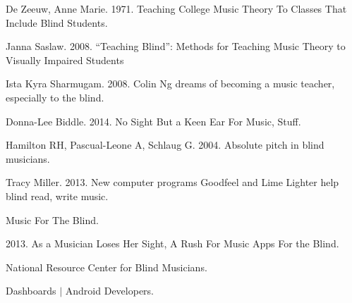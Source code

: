 \documentclass{article}
\begin{document}
\begin{thebibliography}{10}
	De Zeeuw, Anne Marie. 1971. Teaching College Music Theory To Classes That Include Blind Students. 
	
	Janna Saslaw. 2008. ``Teaching Blind'': Methods for Teaching Music Theory to Visually Impaired Students
	\\\texttt{}
	
	Ista Kyra Sharmugam. 2008. Colin Ng dreams of becoming a music teacher, especially to the blind.
	\\\texttt{}
	
	Donna-Lee Biddle. 2014. No Sight But a Keen Ear For Music, Stuff.
	\\\texttt{}
	
	Hamilton RH, Pascual-Leone A, Schlaug G. 2004. Absolute pitch in blind musicians.	
	\\\texttt{}
	
	Tracy Miller. 2013. New computer programs Goodfeel and Lime Lighter help blind read, write music.
	\\\texttt{}
	
	Music For The Blind.
	\\\texttt{}
	
	2013. As a Musician Loses Her Sight, A Rush For Music Apps For the Blind.
	\\\texttt{}
	
	National Resource Center for Blind Musicians.
	\\\texttt{}
	
	Dashboards $\vert$ Android Developers.
	\\\texttt{}
\end{thebibliography}
	
\end{document}
